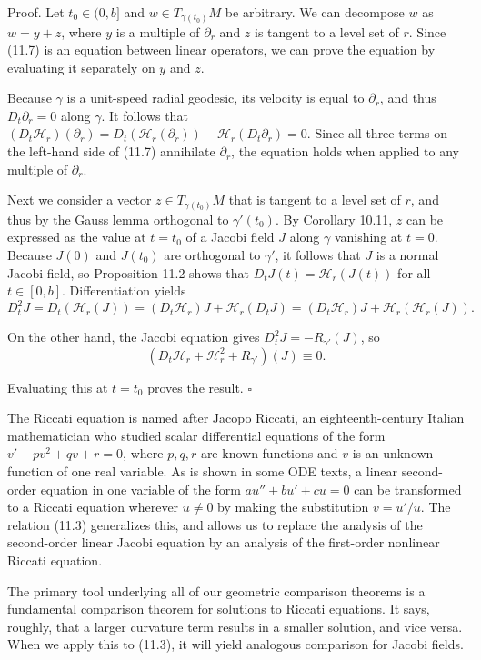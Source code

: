 Proof. Let $t_0 \in (0,b]$ and $w \in T_{\gamma(t_0)} M$ be arbitrary. We can decompose $w$ as $w = y + z$, where $y$ is a multiple of $\partial_r$ and $z$ is tangent to a level set of $r$. Since (11.7) is an equation between linear operators, we can prove the equation by evaluating it separately on $y$ and $z$.

Because $\gamma$ is a unit-speed radial geodesic, its velocity is equal to $\partial_r$, and thus $D_t \partial_r = 0$ along $\gamma$. It follows that $(D_t \mathcal{H}_r)(\partial_r) = D_t(\mathcal{H}_r(\partial_r)) - \mathcal{H}_r(D_t \partial_r) = 0$. Since all three terms on the left-hand side of (11.7) annihilate $\partial_r$, the equation holds when applied to any multiple of $\partial_r$.

Next we consider a vector $z \in T_{\gamma(t_0)} M$ that is tangent to a level set of $r$, and thus by the Gauss lemma orthogonal to $\gamma'(t_0)$. By Corollary 10.11, $z$ can be expressed as the value at $t = t_0$ of a Jacobi field $J$ along $\gamma$ vanishing at $t = 0$. Because $J(0)$ and $J(t_0)$ are orthogonal to $\gamma'$, it follows that $J$ is a normal Jacobi field, so Proposition 11.2 shows that $D_t J(t) = \mathcal{H}_r(J(t))$ for all $t \in [0,b]$. Differentiation yields
\[
D_t^2 J = D_t(\mathcal{H}_r(J)) = (D_t \mathcal{H}_r)J + \mathcal{H}_r(D_t J) = (D_t \mathcal{H}_r)J + \mathcal{H}_r(\mathcal{H}_r(J)).
\]

On the other hand, the Jacobi equation gives $D_t^2 J = -R_{\gamma'}(J)$, so
\[
(D_t \mathcal{H}_r + \mathcal{H}_r^2 + R_{\gamma'})(J) \equiv 0.
\]

Evaluating this at $t = t_0$ proves the result. $\square$

The Riccati equation is named after Jacopo Riccati, an eighteenth-century Italian mathematician who studied scalar differential equations of the form $v' + pv^2 + qv + r = 0$, where $p,q,r$ are known functions and $v$ is an unknown function of one real variable. As is shown in some ODE texts, a linear second-order equation in one variable of the form $au'' + bu' + cu = 0$ can be transformed to a Riccati equation wherever $u \neq 0$ by making the substitution $v = u'/u$. The relation (11.3) generalizes this, and allows us to replace the analysis of the second-order linear Jacobi equation by an analysis of the first-order nonlinear Riccati equation.

The primary tool underlying all of our geometric comparison theorems is a fundamental comparison theorem for solutions to Riccati equations. It says, roughly, that a larger curvature term results in a smaller solution, and vice versa. When we apply this to (11.3), it will yield analogous comparison for Jacobi fields.


